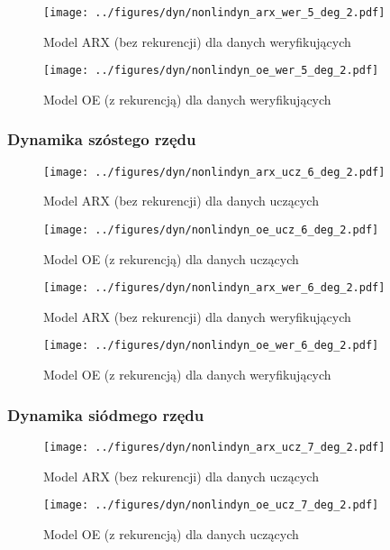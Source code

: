 \documentclass[a4paper,titlepage,11pt,floatssmall]{mwrep}
\begin{document}
\begin{figure}[H]
\centering
\texttt{[image: ../figures/dyn/nonlindyn\_arx\_wer\_5\_deg\_2.pdf]}
\caption{Model ARX (bez rekurencji) dla danych weryfikujących}
\end{figure}

\begin{figure}[H]
\centering
\texttt{[image: ../figures/dyn/nonlindyn\_oe\_wer\_5\_deg\_2.pdf]}
\caption{Model OE (z rekurencją) dla danych weryfikujących}
\end{figure}

\subsubsection{Dynamika szóstego rzędu}
\begin{figure}[H]
\centering
\texttt{[image: ../figures/dyn/nonlindyn\_arx\_ucz\_6\_deg\_2.pdf]}
\caption{Model ARX (bez rekurencji) dla danych uczących}
\end{figure}

\begin{figure}[H]
\centering
\texttt{[image: ../figures/dyn/nonlindyn\_oe\_ucz\_6\_deg\_2.pdf]}
\caption{Model OE (z rekurencją) dla danych uczących}
\end{figure}

\begin{figure}[H]
\centering
\texttt{[image: ../figures/dyn/nonlindyn\_arx\_wer\_6\_deg\_2.pdf]}
\caption{Model ARX (bez rekurencji) dla danych weryfikujących}
\end{figure}

\begin{figure}[H]
\centering
\texttt{[image: ../figures/dyn/nonlindyn\_oe\_wer\_6\_deg\_2.pdf]}
\caption{Model OE (z rekurencją) dla danych weryfikujących}
\end{figure}

\subsubsection{Dynamika siódmego rzędu}
\begin{figure}[H]
\centering
\texttt{[image: ../figures/dyn/nonlindyn\_arx\_ucz\_7\_deg\_2.pdf]}
\caption{Model ARX (bez rekurencji) dla danych uczących}
\end{figure}

\begin{figure}[H]
\centering
\texttt{[image: ../figures/dyn/nonlindyn\_oe\_ucz\_7\_deg\_2.pdf]}
\caption{Model OE (z rekurencją) dla danych uczących}
\end{figure}
\end{document}
